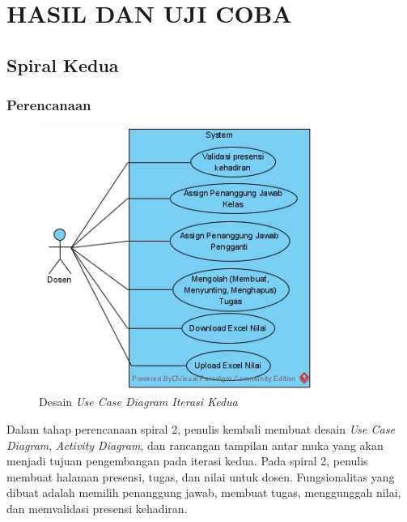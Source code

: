 
\chapter{HASIL DAN UJI COBA}


\section{Spiral Kedua}		%
\subsection{Perencanaan}

\begin{figure}[H]
	\centering
	\includegraphics[width=0.8\textwidth]{gambar/diagram/Use Case Iteration 2}
	\caption{Desain \textit{Use Case Diagram Iterasi Kedua}}
	\label{fig:usecase2nd}
\end{figure}

	Dalam tahap perencanaan spiral 2, penulis kembali membuat desain\textit{ Use Case Diagram}, \textit{Activity Diagram}, dan rancangan tampilan antar muka yang akan menjadi tujuan pengembangan pada iterasi kedua. Pada spiral 2, penulis membuat halaman presensi, tugas, dan nilai untuk dosen. Fungsionalitas yang dibuat adalah memilih penanggung jawab, membuat tugas, menggunggah nilai, dan memvalidasi presensi kehadiran.  

